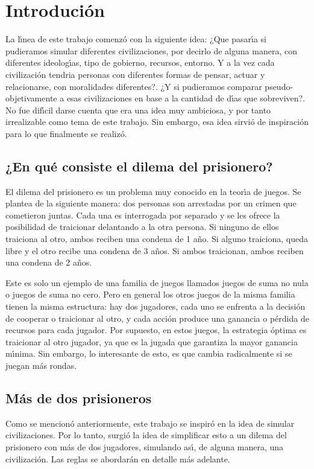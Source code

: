 \documentclass{article}
\begin{document}
\maketitle
\newpage

\section{Introduci\'on}
La l\'{\i}nea de este trabajo comenz\'o con la siguiente idea: ¿Que pasar\'{\i}a si pudieramos simular diferentes civilizaciones, por
decirlo de alguna manera, con diferentes ideolog\'{\i}as, tipo de gobierno, recursos, entorno. Y a la vez cada civilizaci\'on tendria
personas con diferentes formas de pensar, actuar y relacionarse, con moralidades diferentes?. ¿Y si pudieramos comparar pseudo-objetivamente
a esas civilizaciones en base a la cantidad de d\'{\i}as que sobreviven?. No fue dif\'{\i}cil darse cuenta que era una idea muy ambiciosa, y por
tanto irrealizable como tema de este trabajo. Sin embargo, esa idea sirvi\'o de inspiraci\'on para lo que finalmente se realiz\'o.

\subsection*{¿En qu\'e consiste el dilema del prisionero?}
El dilema del prisionero es un problema muy conocido en la teor\'{\i}a de juegos. Se plantea de la siguiente manera: dos personas son arrestadas por
un crimen que cometieron juntas. Cada una es interrogada por separado y se les ofrece la posibilidad de traicionar delantando a la otra persona. Si ninguno de
ellos traiciona al otro, ambos reciben una condena de 1 a\~no. Si alguno traiciona, queda libre y el otro recibe una condena de 3 a\~nos. Si ambos traicionan,
ambos reciben una condena de 2 a\~nos.

Este es solo un ejemplo de una familia de juegos llamados juegos de suma no nula o juegos de suma no cero. Pero en general los otros juegos de la misma familia
tienen la misma estructura: hay dos jugadores, cada uno se enfrenta a la decisi\'on de cooperar o traicionar al otro, y cada acci\'on produce una ganancia o
p\'erdida de recursos para cada jugador. Por supuesto, en estos juegos, la estrategia \'optima es traicionar al otro jugador, ya que es la jugada que garantiza
la mayor ganancia m\'{\i}nima. Sin embargo, lo interesante de esto, es que cambia radicalmente si se juegan m\'as rondas.

\subsection*{M\'as de dos prisioneros}
Como se mencion\'o anteriormente, este trabajo se inspir\'o en la idea de simular civilizaciones. Por lo tanto, surgi\'o la idea de simplificar esto
a un dilema del prisionero con m\'as de dos jugadores, simulando as\'{\i}, de alguna manera, una civilizaci\'on. Las reglas se abordar\'an en detalle
m\'as adelante.
\newpage
\end{document}
